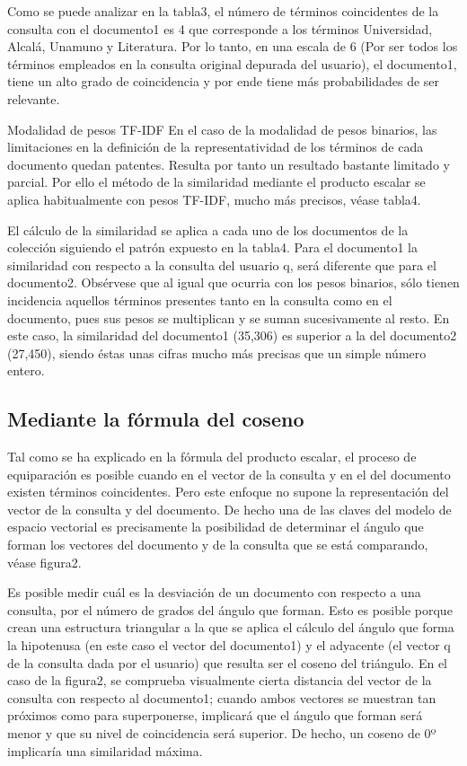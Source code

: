 \documentclass{article}
\begin{document}
 Como se puede analizar en la tabla3, el número de términos coincidentes de la consulta con el documento1 es 4 que corresponde a los términos Universidad, Alcalá, Unamuno y Literatura. Por lo tanto, en una escala de 6 (Por ser todos los términos empleados en la consulta original depurada del usuario), el documento1, tiene un alto grado de coincidencia y por ende tiene más probabilidades de ser relevante.

Modalidad de pesos TF-IDF
En el caso de la modalidad de pesos binarios, las limitaciones en la definición de la representatividad de los términos de cada documento quedan patentes. Resulta por tanto un resultado bastante limitado y parcial. Por ello el método de la similaridad mediante el producto escalar se aplica habitualmente con pesos TF-IDF, mucho más precisos, véase tabla4.

El cálculo de la similaridad se aplica a cada uno de los documentos de la colección siguiendo el patrón expuesto en la tabla4. Para el documento1 la similaridad con respecto a la consulta del usuario q, será diferente que para el documento2. Obsérvese que al igual que ocurria con los pesos binarios, sólo tienen incidencia aquellos términos presentes tanto en la consulta como en el documento, pues sus pesos se multiplican y se suman sucesivamente al resto. En este caso, la similaridad del documento1 (35,306) es superior a la del documento2 (27,450), siendo éstas unas cifras mucho más precisas que un simple número entero.

\subsection{Mediante la fórmula del coseno}

Tal como se ha explicado en la fórmula del producto escalar, el proceso de equiparación es posible cuando en el vector de la consulta y en el del documento existen términos coincidentes. Pero este enfoque no supone la representación del vector de la consulta y del documento. De hecho una de las claves del modelo de espacio vectorial es precisamente la posibilidad de determinar el ángulo que forman los vectores del documento y de la consulta que se está comparando, véase figura2.

Es posible medir cuál es la desviación de un documento con respecto a una consulta, por el número de grados del ángulo que forman. Esto es posible porque crean una estructura triangular a la que se aplica el cálculo del ángulo que forma la hipotenusa (en este caso el vector del documento1) y el adyacente (el vector q de la consulta dada por el usuario) que resulta ser el coseno del triángulo. En el caso de la figura2, se comprueba visualmente cierta distancia del vector de la consulta con respecto al documento1; cuando ambos vectores se muestran tan próximos como para superponerse, implicará que el ángulo que forman será menor y que su nivel de coincidencia será superior. De hecho, un coseno de 0º implicaría una similaridad máxima.
\end{document}
